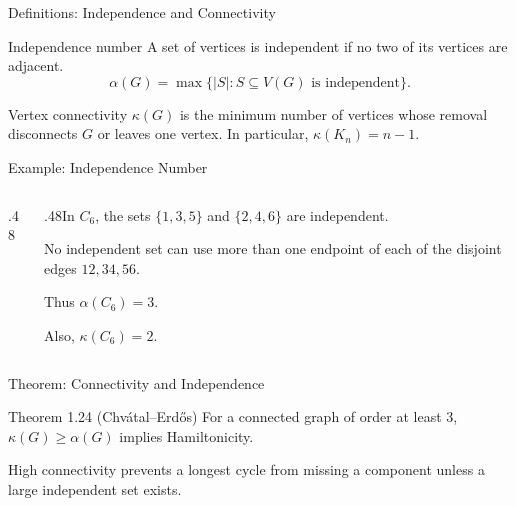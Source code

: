 \documentclass[aspectratio=169,11pt]{beamer}
\begin{document}
\begin{frame}{Definitions: Independence and Connectivity}
\large
\begin{block}{Independence number}
A set of vertices is independent if no two of its vertices are adjacent.\[\alpha(G)=\max\{|S|:S\subseteq V(G)\text{ is independent}\}.\]
\end{block}
\begin{block}{Vertex connectivity}
$\kappa(G)$ is the minimum number of vertices whose removal disconnects $G$ or leaves one vertex. In particular, $\kappa(K_n)=n-1$.
\end{block}

\end{frame}

\begin{frame}{Example: Independence Number}
\large
\begin{columns}[c,onlytextwidth]\begin{column}{.48\textwidth}\begin{center}\end{center}\end{column}\begin{column}{.48\textwidth}In $C_6$, the sets $\{1,3,5\}$ and $\{2,4,6\}$ are independent.\par\medskip No independent set can use more than one endpoint of each of the disjoint edges $12,34,56$.\par\medskip Thus $\alpha(C_6)=3$.\par\medskip Also, $\kappa(C_6)=2$.\end{column}\end{columns}
\end{frame}

\begin{frame}{Theorem: Connectivity and Independence}
\large
\begin{block}{Theorem 1.24 (Chv\'atal--Erd\H{o}s)}
For a connected graph of order at least $3$, $\kappa(G)\ge\alpha(G)$ implies Hamiltonicity.
\end{block}
\bigskip High connectivity prevents a longest cycle from missing a component unless a large independent set exists.
\end{frame}
\end{document}
